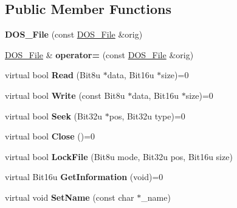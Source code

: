 \subsection*{Public Member Functions}
\begin{DoxyCompactItemize}
\item 
\hypertarget{classDOS__File_a1963c62fce9c71c29c5ce6596545a66f}{{\bfseries D\-O\-S\-\_\-\-File} (const \hyperlink{classDOS__File}{D\-O\-S\-\_\-\-File} \&orig)}\label{classDOS__File_a1963c62fce9c71c29c5ce6596545a66f}

\item 
\hypertarget{classDOS__File_a083eb382cd14b00d9145bfa4bd50cb67}{\hyperlink{classDOS__File}{D\-O\-S\-\_\-\-File} \& {\bfseries operator=} (const \hyperlink{classDOS__File}{D\-O\-S\-\_\-\-File} \&orig)}\label{classDOS__File_a083eb382cd14b00d9145bfa4bd50cb67}

\item 
\hypertarget{classDOS__File_aeebb41f3002ca630c8fb29575295a110}{virtual bool {\bfseries Read} (Bit8u $\ast$data, Bit16u $\ast$size)=0}\label{classDOS__File_aeebb41f3002ca630c8fb29575295a110}

\item 
\hypertarget{classDOS__File_aab7be6c45ed8e3be5eabf6b8f025e729}{virtual bool {\bfseries Write} (const Bit8u $\ast$data, Bit16u $\ast$size)=0}\label{classDOS__File_aab7be6c45ed8e3be5eabf6b8f025e729}

\item 
\hypertarget{classDOS__File_a1698a73219cb9addf47c62cd33c56d5b}{virtual bool {\bfseries Seek} (Bit32u $\ast$pos, Bit32u type)=0}\label{classDOS__File_a1698a73219cb9addf47c62cd33c56d5b}

\item 
\hypertarget{classDOS__File_a69cb82dd341a8a126478c2e6235c0805}{virtual bool {\bfseries Close} ()=0}\label{classDOS__File_a69cb82dd341a8a126478c2e6235c0805}

\item 
\hypertarget{classDOS__File_afd1adec0fa0e51a83d5f47b4be21d890}{virtual bool {\bfseries Lock\-File} (Bit8u mode, Bit32u pos, Bit16u size)}\label{classDOS__File_afd1adec0fa0e51a83d5f47b4be21d890}

\item 
\hypertarget{classDOS__File_a3956bfb846f17650612c7665f0226c9c}{virtual Bit16u {\bfseries Get\-Information} (void)=0}\label{classDOS__File_a3956bfb846f17650612c7665f0226c9c}

\item 
\hypertarget{classDOS__File_ac6844051553dcd169d68cb52a2b7da7d}{virtual void {\bfseries Set\-Name} (const char $\ast$\-\_\-name)}\label{classDOS__File_ac6844051553dcd169d68cb52a2b7da7d}


\end{DoxyCompactItemize}

